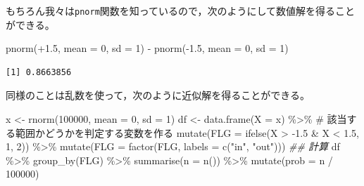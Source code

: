\documentclass[
  a4paper,
]{ltjsbook}
\newenvironment{Shaded}{\begin{snugshade}}{\end{snugshade}}
\newcommand{\AttributeTok}[1]{\textcolor[rgb]{0.40,0.45,0.13}{#1}}
\newcommand{\CommentTok}[1]{\textcolor[rgb]{0.37,0.37,0.37}{#1}}
\newcommand{\DecValTok}[1]{\textcolor[rgb]{0.68,0.00,0.00}{#1}}
\newcommand{\DocumentationTok}[1]{\textcolor[rgb]{0.37,0.37,0.37}{\textit{#1}}}
\newcommand{\FloatTok}[1]{\textcolor[rgb]{0.68,0.00,0.00}{#1}}
\newcommand{\FunctionTok}[1]{\textcolor[rgb]{0.28,0.35,0.67}{#1}}
\newcommand{\NormalTok}[1]{\textcolor[rgb]{0.00,0.23,0.31}{#1}}
\newcommand{\OtherTok}[1]{\textcolor[rgb]{0.00,0.23,0.31}{#1}}
\newcommand{\SpecialCharTok}[1]{\textcolor[rgb]{0.37,0.37,0.37}{#1}}
\newcommand{\StringTok}[1]{\textcolor[rgb]{0.13,0.47,0.30}{#1}}
\begin{document}
もちろん我々は\texttt{pnorm}関数を知っているので，次のようにして数値解を得ることができる。

\begin{Shaded}
\begin{Highlighting}[]
\FunctionTok{pnorm}\NormalTok{(}\SpecialCharTok{+}\FloatTok{1.5}\NormalTok{, }\AttributeTok{mean =} \DecValTok{0}\NormalTok{, }\AttributeTok{sd =} \DecValTok{1}\NormalTok{) }\SpecialCharTok{{-}} \FunctionTok{pnorm}\NormalTok{(}\SpecialCharTok{{-}}\FloatTok{1.5}\NormalTok{, }\AttributeTok{mean =} \DecValTok{0}\NormalTok{, }\AttributeTok{sd =} \DecValTok{1}\NormalTok{)}
\end{Highlighting}
\end{Shaded}

\begin{verbatim}
[1] 0.8663856
\end{verbatim}

同様のことは乱数を使って，次のように近似解を得ることができる。

\begin{Shaded}
\begin{Highlighting}[]
\NormalTok{x }\OtherTok{\textless{}{-}} \FunctionTok{rnorm}\NormalTok{(}\DecValTok{100000}\NormalTok{, }\AttributeTok{mean =} \DecValTok{0}\NormalTok{, }\AttributeTok{sd =} \DecValTok{1}\NormalTok{)}
\NormalTok{df }\OtherTok{\textless{}{-}} \FunctionTok{data.frame}\NormalTok{(}\AttributeTok{X =}\NormalTok{ x) }\SpecialCharTok{\%\textgreater{}\%}
  \CommentTok{\# 該当する範囲かどうかを判定する変数を作る}
  \FunctionTok{mutate}\NormalTok{(}\AttributeTok{FLG =} \FunctionTok{ifelse}\NormalTok{(X }\SpecialCharTok{\textgreater{}} \SpecialCharTok{{-}}\FloatTok{1.5} \SpecialCharTok{\&}\NormalTok{ X }\SpecialCharTok{\textless{}} \FloatTok{1.5}\NormalTok{, }\DecValTok{1}\NormalTok{, }\DecValTok{2}\NormalTok{)) }\SpecialCharTok{\%\textgreater{}\%}
  \FunctionTok{mutate}\NormalTok{(}\AttributeTok{FLG =} \FunctionTok{factor}\NormalTok{(FLG, }\AttributeTok{labels =} \FunctionTok{c}\NormalTok{(}\StringTok{"in"}\NormalTok{, }\StringTok{"out"}\NormalTok{)))}
\DocumentationTok{\#\# 計算}
\NormalTok{df }\SpecialCharTok{\%\textgreater{}\%}
  \FunctionTok{group\_by}\NormalTok{(FLG) }\SpecialCharTok{\%\textgreater{}\%}
  \FunctionTok{summarise}\NormalTok{(}\AttributeTok{n =} \FunctionTok{n}\NormalTok{()) }\SpecialCharTok{\%\textgreater{}\%}
  \FunctionTok{mutate}\NormalTok{(}\AttributeTok{prob =}\NormalTok{ n }\SpecialCharTok{/} \DecValTok{100000}\NormalTok{)}
\end{Highlighting}
\end{Shaded}
\end{document}
